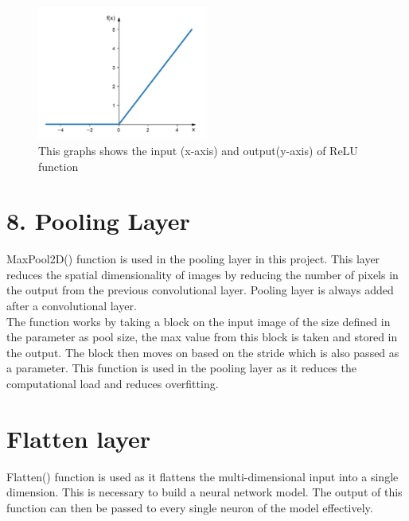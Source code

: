 \begin{figure}[h!]
\centering
\includegraphics[width=0.5\textwidth]{RELU.png}
\caption{\label{fig:frog}This graphs shows the input (x-axis) and output(y-axis) of ReLU function}
\end{figure}

\section{8.	Pooling Layer}
MaxPool2D() function is used in the pooling layer in this project. This layer reduces the spatial dimensionality of images by reducing the number of pixels in the output from the previous convolutional layer. Pooling layer is always added after a convolutional layer. \\
The function works by taking a block on the input image of the size defined in the parameter as pool size, the max value from this block is taken and stored in the output. The block then moves on based on the stride which is also passed as a parameter. This function is used in the pooling layer as it reduces the computational load and reduces overfitting.

\section{Flatten layer}
Flatten() function is used as it flattens the multi-dimensional input into a single dimension. This is necessary to build a neural network model. The output of this function can then be passed to every single neuron of the model effectively.

